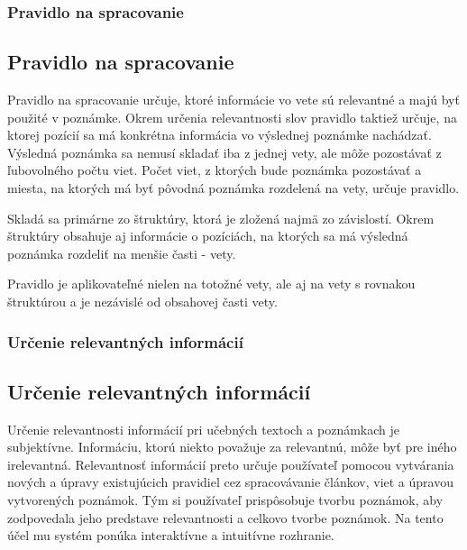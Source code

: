 %
%
{
	\subsubsection{Pravidlo na spracovanie}
}
{
	\subsection{Pravidlo na spracovanie}
}
\label{subsubsection:rule_for_processing}
Pravidlo na spracovanie určuje, ktoré informácie vo vete sú relevantné a majú byť použité v poznámke. Okrem určenia relevantnosti slov pravidlo taktiež určuje, na ktorej pozícií sa má konkrétna informácia vo výslednej poznámke nachádzať. Výsledná poznámka sa nemusí skladať iba z jednej vety, ale môže pozostávať z ľubovolného počtu viet. Počet viet, z ktorých bude poznámka pozostávať a miesta, na ktorých má byť pôvodná poznámka rozdelená na vety, určuje pravidlo.

Skladá sa primárne zo štruktúry, ktorá je zložená najmä zo závislostí. Okrem štruktúry obsahuje aj informácie o pozíciách, na ktorých sa má výsledná poznámka rozdeliť na menšie časti - vety.

Pravidlo je aplikovateľné nielen na totožné vety, ale aj na vety s rovnakou štruktúrou a je nezávislé od obsahovej časti vety.

%
%
{
	\subsubsection{Určenie relevantných informácií}
}
{
	\subsection{Určenie relevantných informácií}
}
\label{subsubsection:determination_of_relevant_information}
Určenie relevantnosti informácií pri učebných textoch a poznámkach je subjektívne. Informáciu, ktorú niekto považuje za relevantnú, môže byť pre iného irelevantná. Relevantnosť informácií preto určuje používateľ pomocou vytvárania nových a úpravy existujúcich pravidiel cez spracovávanie článkov, viet a úpravou vytvorených poznámok. Tým si používateľ prispôsobuje tvorbu poznámok, aby zodpovedala jeho predstave relevantnosti a celkovo tvorbe poznámok. Na tento účel mu systém ponúka interaktívne a intuitívne rozhranie.

